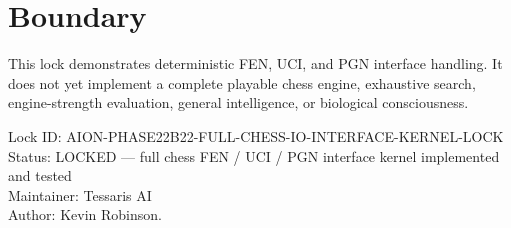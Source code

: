 \documentclass[11pt,a4paper]{article}
\begin{document}
\section{Boundary}

This lock demonstrates deterministic FEN, UCI, and PGN interface handling. It does not yet implement a complete playable chess engine, exhaustive search, engine-strength evaluation, general intelligence, or biological consciousness.

\bigskip

\noindent
Lock ID: AION-PHASE22B22-FULL-CHESS-IO-INTERFACE-KERNEL-LOCK\\
Status: LOCKED --- full chess FEN / UCI / PGN interface kernel implemented and tested\\
Maintainer: Tessaris AI\\
Author: Kevin Robinson.
\end{document}
